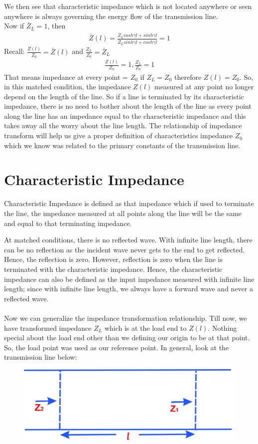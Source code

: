 We then see that characteristic impedance which is not located anywhere or seen anywhere is always governing the energy flow of the transmission line.\\
Now if $\bar{Z}_L = 1$, then 
\begin{align*}
\bar{Z}(l) = {\frac{\bar{Z}_Lcosh\gamma l + sinh\gamma l}{\bar{Z}_Lsinh\gamma l + cosh\gamma l}} = 1
\end{align*}
Recall: $\frac{Z(l)}{Z_0} = \bar{Z}(l)$ and $\frac{Z_L}{Z_0} = \bar{Z}_L$\\
\begin{align*}
\frac{Z(l)}{Z_0} = 1,\frac{Z_L}{Z_0} = 1
\end{align*}
That means impedance at every point = $Z_0$ if $Z_L = Z_0$ therefore $Z(l) = Z_0$. So, in this matched condition, the impedance $Z(l)$ measured at any point no longer depend on the length of the line. So if a line is terminated by its characteristic impedance, there is no need to bother about the length of the line as every point along the line has an impedance equal to the characteristic impedance and this takes away all the worry about the line length.
The relationship of impedance transform will help us give a proper definition of characteristics impedance $Z_0$ which we know was related to the primary constants of the transmission line.
\section{Characteristic Impedance}  
Characteristic Impedance is defined as that impedance which if used to terminate the line, the impedance measured at all points along the line will be the same and equal to that terminating impedance.

At matched conditions, there is no reflected wave. With infinite line length, there can be no reflection as the incident wave never gets to the end to get reflected. Hence, the reflection is zero. However, reflection is zero when the line is terminated with the characteristic impedance. Hence, the characteristic impedance can also be defined as the input impedance measured with infinite line length; since with infinite line length, we always have a forward wave and never a reflected wave.\\\\
Now we can generalize the impedance transformation relationship. Till now, we have transformed impedance $Z_L$ which is at the load end to $Z(l)$. Nothing special about the load end other than we defining our origin to be at that point. So, the load point was used as our reference point. In general, look at the transmission line below:
\begin{figure}[h]
\centering
\includegraphics[scale=0.45]{./graphics/1234}
\caption{}
\end{figure}

